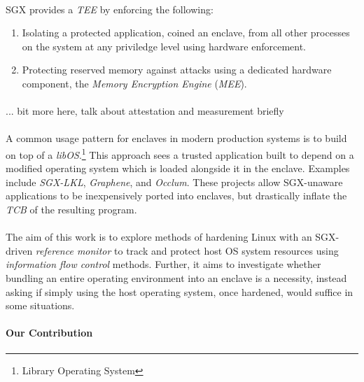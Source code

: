 \paragraph{} SGX provides a \textit{TEE} by enforcing the following:

\begin{enumerate}
    \item Isolating a protected application, coined an enclave, from all other processes on the system at any priviledge level using hardware enforcement.
    \item Protecting reserved memory against attacks using a dedicated hardware component, the \textit{Memory Encryption Engine} (\textit{MEE}). 
\end{enumerate}

\paragraph{} ... bit more here, talk about attestation and measurement briefly

\paragraph{} A common usage pattern for enclaves in modern production systems is to build on top of a \textit{libOS}.\footnote{Library Operating System} This approach sees a trusted application built to depend on a modified operating system which is loaded alongside it in the enclave. Examples include \textit{SGX-LKL}, \textit{Graphene}, and \textit{Occlum}. These projects allow SGX-unaware applications to be inexpensively ported into enclaves, but drastically inflate the \textit{TCB} of the resulting program.

\paragraph{} The aim of this work is to explore methods of hardening Linux with an SGX-driven \textit{reference monitor} to track and protect host OS system resources using \textit{information flow control} methods. Further, it aims to investigate whether bundling an entire operating environment into an enclave is a necessity, instead asking if simply using the host operating system, once hardened, would suffice in some situations.


\paragraph{Our Contribution}

